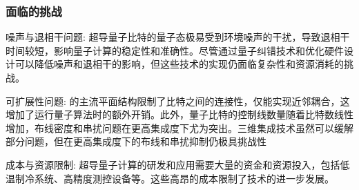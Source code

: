 \subsubsection{面临的挑战}
\begin{paralist}
    \item 噪声与退相干问题:
    超导量子比特的量子态极易受到环境噪声的干扰，导致退相干时间较短，影响量子计算的稳定性和准确性。尽管通过量子纠错技术和优化硬件设计可以降低噪声和退相干的影响，但这些技术的实现仍面临复杂性和资源消耗的挑战。
    \item 可扩展性问题:
    的主流平面结构限制了比特之间的连接性，仅能实现近邻耦合，这增加了运行量子算法时的额外开销。此外，量子比特的控制线数量随着比特数线性增加，布线密度和串扰问题在更高集成度下尤为突出。三维集成技术虽然可以缓解部分问题，但在更高集成度下的布线和串扰抑制仍极具挑战性
    \item 成本与资源限制:
    超导量子计算的研发和应用需要大量的资金和资源投入，包括低温制冷系统、高精度测控设备等。这些高昂的成本限制了技术的进一步发展。
\end{paralist}


